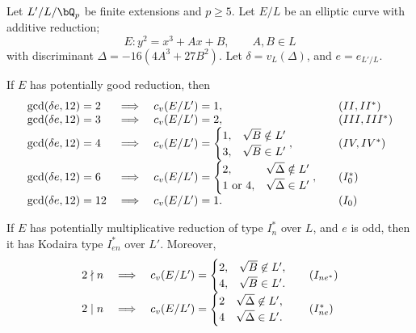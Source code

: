 \begin{lemma}\label{tamagawa-num}
    Let $L' /L / \bQ_p$ be finite extensions and $p \geq 5$. Let $E / L$ be an elliptic curve with additive reduction; 
    \[ E \colon y^2 = x^3 + Ax + B, \qquad A, B \in L \]
    with discriminant $\Delta = -16(4 A^3 + 27 B^2)$. Let $\delta = v_L(\Delta)$, and $e = e_{L' / L}$.

    If $E$ has potentially good reduction, then 
        \[
        \begin{array}{l l l l}
            \gcd(\delta e, 12) = 2 & \implies & c_v(E / L') = 1, & \quad (II, II^*) \\
            \gcd(\delta e, 12) = 3 & \implies & c_v(E / L') = 2, & \quad (III, III^*) \\
            \gcd(\delta e, 12) = 4 & \implies & c_v(E / L') = \begin{cases} 1, & \sqrt{B} \notin L'
                                \\ 3, & \sqrt{B} \in L' \end{cases}, & \quad (IV, IV^*) \\
            \gcd(\delta e, 12) = 6 & \implies & c_v(E / L') = \begin{cases} 2, & \sqrt{\Delta} \notin L'
                \\ 1 \ \text{or} \ 4, & \sqrt{\Delta} \in L' \end{cases}, & \quad (I_0^*) \\
            \gcd(\delta e, 12) = 12 & \implies & c_v(E / L') = 1. & \quad (I_0)
        \end{array}
        \]

    If $E$ has potentially multiplicative reduction of type $I_n^*$ over $L$, and $e$ is odd, then it has Kodaira type $I_{en}^*$ over $L'$. Moreover, 
    \[
        \begin{array}{l l l l}
        2 \nmid n & \implies & c_v(E / L') = \begin{cases} 2, & \sqrt{B} \not\in L', \\ 4, & \sqrt{B} \in L'. \end{cases} & \quad (I_{ne^*}) \\
        2 \mid n & \implies & c_v(E / L') = \begin{cases} 2 & \sqrt{\Delta} \not\in L', \\ 4 & \sqrt{\Delta} \in L' .\end{cases} & \quad ({I_{ne}^*})   
        \end{array} 
    \]
\end{lemma}

